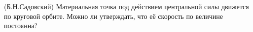 (Б.Н.Садовский)
Материальная точка под действием центральной силы движется по круговой
орбите. Можно ли утверждать, что её скорость по величине постоянна?
